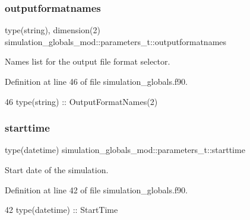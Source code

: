 \subsubsection{\texorpdfstring{outputformatnames}{outputformatnames}}
{\footnotesize\ttfamily type(string), dimension(2) simulation\+\_\+globals\+\_\+mod\+::parameters\+\_\+t\+::outputformatnames\hspace{0.3cm}{\ttfamily [private]}}



Names list for the output file format selector. 



Definition at line 46 of file simulation\+\_\+globals.\+f90.


\begin{DoxyCode}
46         \textcolor{keywordtype}{type}(string) :: OutputFormatNames(2)
\end{DoxyCode}
\mbox{\label{structsimulation__globals__mod_1_1parameters__t_a8e3abdcb1022685a07ca65c3c6a50203}} 
\subsubsection{\texorpdfstring{starttime}{starttime}}
{\footnotesize\ttfamily type(datetime) simulation\+\_\+globals\+\_\+mod\+::parameters\+\_\+t\+::starttime\hspace{0.3cm}{\ttfamily [private]}}



Start date of the simulation. 



Definition at line 42 of file simulation\+\_\+globals.\+f90.


\begin{DoxyCode}
42         \textcolor{keywordtype}{type}(datetime) :: StartTime
\end{DoxyCode}
\mbox{\label{structsimulation__globals__mod_1_1parameters__t_ad56e8a5217faee90d48d0811a36cce32}} 
